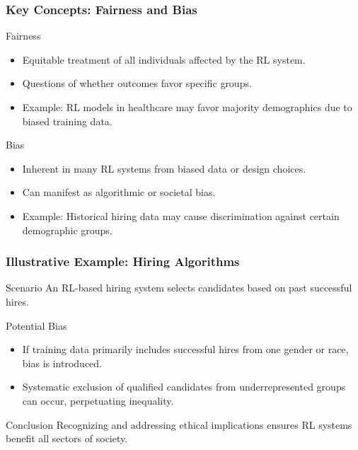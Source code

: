 \documentclass{beamer}
\begin{document}
\begin{frame}[fragile]
    \frametitle{Key Concepts: Fairness and Bias}
    
    \begin{block}{Fairness}
        \begin{itemize}
            \item Equitable treatment of all individuals affected by the RL system.
            \item Questions of whether outcomes favor specific groups.
            \item Example: RL models in healthcare may favor majority demographics due to biased training data.
        \end{itemize}
    \end{block}
    
    \begin{block}{Bias}
        \begin{itemize}
            \item Inherent in many RL systems from biased data or design choices.
            \item Can manifest as algorithmic or societal bias.
            \item Example: Historical hiring data may cause discrimination against certain demographic groups.
        \end{itemize}
    \end{block}
\end{frame}

\begin{frame}[fragile]
    \frametitle{Illustrative Example: Hiring Algorithms}
    
    \begin{block}{Scenario}
        An RL-based hiring system selects candidates based on past successful hires.
    \end{block}
    
    \begin{block}{Potential Bias}
        \begin{itemize}
            \item If training data primarily includes successful hires from one gender or race, bias is introduced.
            \item Systematic exclusion of qualified candidates from underrepresented groups can occur, perpetuating inequality.
        \end{itemize}
    \end{block}
    
    \begin{block}{Conclusion}
        Recognizing and addressing ethical implications ensures RL systems benefit all sectors of society.
    \end{block}
\end{frame}
\end{document}
